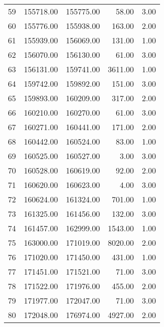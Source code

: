 \begin{tabular}{rrrrr}
  59 & 155718.00 & 155775.00 & 58.00 & 3.00 \\ 
  60 & 155776.00 & 155938.00 & 163.00 & 2.00 \\ 
  61 & 155939.00 & 156069.00 & 131.00 & 1.00 \\ 
  62 & 156070.00 & 156130.00 & 61.00 & 3.00 \\ 
  63 & 156131.00 & 159741.00 & 3611.00 & 1.00 \\ 
  64 & 159742.00 & 159892.00 & 151.00 & 3.00 \\ 
  65 & 159893.00 & 160209.00 & 317.00 & 2.00 \\ 
  66 & 160210.00 & 160270.00 & 61.00 & 3.00 \\ 
  67 & 160271.00 & 160441.00 & 171.00 & 2.00 \\ 
  68 & 160442.00 & 160524.00 & 83.00 & 1.00 \\ 
  69 & 160525.00 & 160527.00 & 3.00 & 3.00 \\ 
  70 & 160528.00 & 160619.00 & 92.00 & 2.00 \\ 
  71 & 160620.00 & 160623.00 & 4.00 & 3.00 \\ 
  72 & 160624.00 & 161324.00 & 701.00 & 1.00 \\ 
  73 & 161325.00 & 161456.00 & 132.00 & 3.00 \\ 
  74 & 161457.00 & 162999.00 & 1543.00 & 1.00 \\ 
  75 & 163000.00 & 171019.00 & 8020.00 & 2.00 \\ 
  76 & 171020.00 & 171450.00 & 431.00 & 1.00 \\ 
  77 & 171451.00 & 171521.00 & 71.00 & 3.00 \\ 
  78 & 171522.00 & 171976.00 & 455.00 & 2.00 \\ 
  79 & 171977.00 & 172047.00 & 71.00 & 3.00 \\ 
  80 & 172048.00 & 176974.00 & 4927.00 & 2.00 \\ 
   \hline
\end{tabular}
\endgroup
